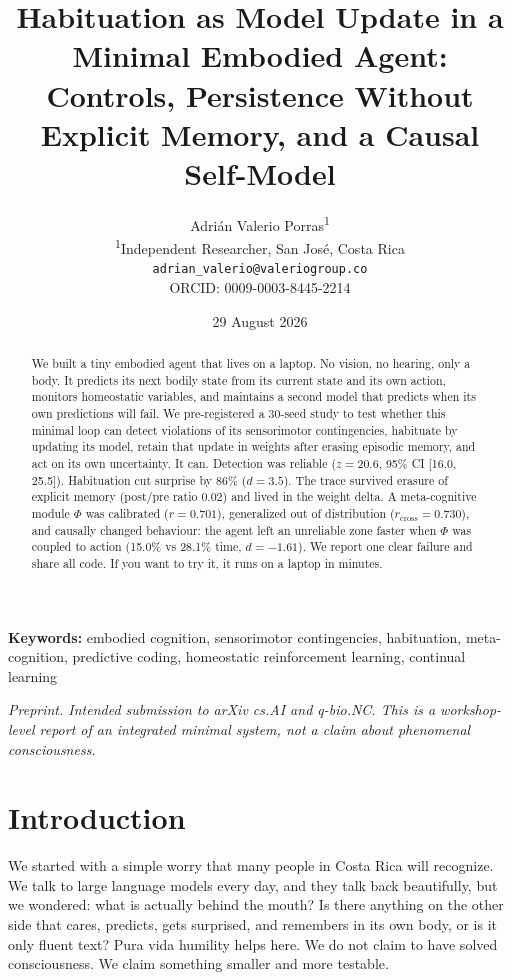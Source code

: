 \documentclass[11pt,a4paper]{article}
\title{Habituation as Model Update in a Minimal Embodied Agent:\\
Controls, Persistence Without Explicit Memory, and a Causal Self-Model}
\author{Adri\'an Valerio Porras\textsuperscript{1} \\ \small \textsuperscript{1}Independent Researcher, San Jos\'e, Costa Rica \\ \small \texttt{adrian_valerio@valeriogroup.co} \\ \small ORCID: 0009-0003-8445-2214 }
\date{29 August 2026}
\begin{document}
\maketitle

\begin{abstract}
We built a tiny embodied agent that lives on a laptop. No vision, no hearing, only a body. It predicts its next bodily state from its current state and its own action, monitors homeostatic variables, and maintains a second model that predicts when its own predictions will fail. We pre-registered a 30-seed study to test whether this minimal loop can detect violations of its sensorimotor contingencies, habituate by updating its model, retain that update in weights after erasing episodic memory, and act on its own uncertainty. It can. Detection was reliable ($z=20.6$, 95\% CI [16.0, 25.5]). Habituation cut surprise by 86\% ($d=3.5$). The trace survived erasure of explicit memory (post/pre ratio 0.02) and lived in the weight delta. A meta-cognitive module $\Phi$ was calibrated ($r=0.701$), generalized out of distribution ($r_{\mathrm{cross}}=0.730$), and causally changed behaviour: the agent left an unreliable zone faster when $\Phi$ was coupled to action (15.0\% vs 28.1\% time, $d=-1.61$). We report one clear failure and share all code. If you want to try it, it runs on a laptop in minutes.
\end{abstract}

\noindent\textbf{Keywords:} embodied cognition, sensorimotor contingencies, habituation, meta-cognition, predictive coding, homeostatic reinforcement learning, continual learning

\noindent\textit{Preprint. Intended submission to arXiv cs.AI and q-bio.NC. This is a workshop-level report of an integrated minimal system, not a claim about phenomenal consciousness.}


\section{Introduction}

We started with a simple worry that many people in Costa Rica will recognize. We talk to large language models every day, and they talk back beautifully, but we wondered: what is actually behind the mouth? Is there anything on the other side that cares, predicts, gets surprised, and remembers in its own body, or is it only fluent text? Pura vida humility helps here. We do not claim to have solved consciousness. We claim something smaller and more testable.
\end{document}
